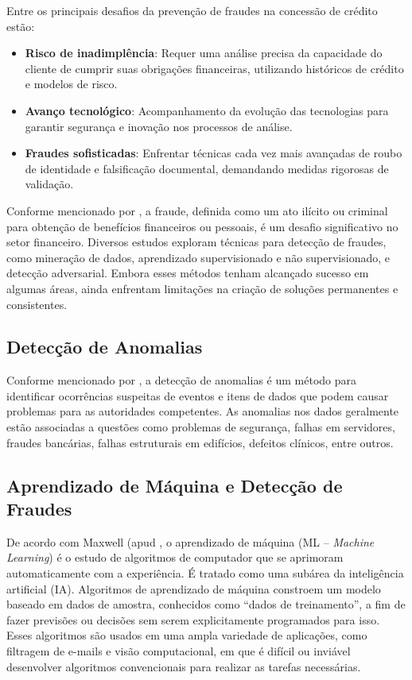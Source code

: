 \documentclass[12pt,a4paper]{article}
\begin{document}
Entre os principais desafios da prevenção de fraudes na concessão de crédito estão:
\begin{itemize}
    \item \textbf{Risco de inadimplência}: Requer uma análise precisa da capacidade do cliente de cumprir suas obrigações financeiras, utilizando históricos de crédito e modelos de risco.
    \item \textbf{Avanço tecnológico}: Acompanhamento da evolução das tecnologias para garantir segurança e inovação nos processos de análise.
    \item \textbf{Fraudes sofisticadas}: Enfrentar técnicas cada vez mais avançadas de roubo de identidade e falsificação documental, demandando medidas rigorosas de validação.
\end{itemize}

Conforme mencionado por \cite{maniraj2019}, a fraude, definida como um ato ilícito ou criminal para obtenção de benefícios financeiros ou pessoais, é um desafio significativo no setor financeiro. Diversos estudos exploram técnicas para detecção de fraudes, como mineração de dados, aprendizado supervisionado e não supervisionado, e detecção adversarial. Embora esses métodos tenham alcançado sucesso em algumas áreas, ainda enfrentam limitações na criação de soluções permanentes e consistentes.
\subsection{Detecção de Anomalias}

Conforme mencionado por \cite{gupta2020}, a detecção de anomalias é um método para identificar ocorrências suspeitas de eventos e itens de dados que podem causar problemas para as autoridades competentes. As anomalias nos dados geralmente estão associadas a questões como problemas de segurança, falhas em servidores, fraudes bancárias, falhas estruturais em edifícios, defeitos clínicos, entre outros.

\subsection{Aprendizado de Máquina e Detecção de Fraudes}

De acordo com Maxwell (apud \cite{martins2022}, o aprendizado de máquina (ML – \textit{Machine Learning}) é o estudo de algoritmos de computador que se aprimoram automaticamente com a experiência. É tratado como uma subárea da inteligência artificial (IA). Algoritmos de aprendizado de máquina constroem um modelo baseado em dados de amostra, conhecidos como “dados de treinamento”, a fim de fazer previsões ou decisões sem serem explicitamente programados para isso. Esses algoritmos são usados em uma ampla variedade de aplicações, como filtragem de e-mails e visão computacional, em que é difícil ou inviável desenvolver algoritmos convencionais para realizar as tarefas necessárias.
\end{document}

